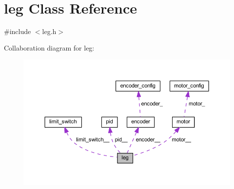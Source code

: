 \hypertarget{classleg}{}\section{leg Class Reference}
\label{classleg}


{\ttfamily \#include $<$leg.\+h$>$}



Collaboration diagram for leg\+:
\nopagebreak
\begin{figure}[H]
\begin{center}
\leavevmode
\includegraphics[width=350pt]{classleg__coll__graph}
\end{center}
\end{figure}
